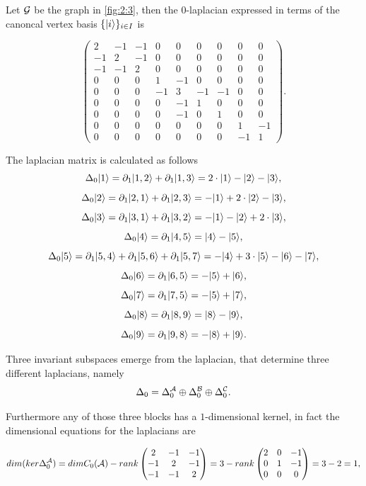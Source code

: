 \documentclass[../2.tex]{subfiles}
\begin{document}
    \begin{exa}
        Let $\mathcal{G}$ be the graph  in \autoref{fig:2:3}, then the $0$-laplacian expressed in terms of the canoncal vertex basis $\{| i \rangle\}_{i \in I}$ is

        \[\begin{pmatrix}
                2 & -1 & -1 & 0 & 0 & 0 & 0 & 0 & 0 \\
                -1 & 2 & -1 & 0 & 0 & 0 & 0 & 0 & 0 \\
                -1 & -1 & 2 & 0 & 0 & 0 & 0 & 0 & 0 \\
                0 & 0 & 0 & 1 & -1 & 0 & 0 & 0 & 0 \\
                0 & 0 & 0 & -1 & 3 & -1 & -1 & 0 & 0 \\
                0 & 0 & 0 & 0 & -1 & 1 & 0 & 0 & 0 \\
                0 & 0 & 0 & 0 & -1 & 0 & 1 & 0 & 0 \\
                0 & 0 & 0 & 0 & 0 & 0 & 0 & 1 & -1 \\
                0 & 0 & 0 & 0 & 0 & 0 & 0 & -1 & 1 
            \end{pmatrix}. \] 

        The laplacian matrix is calculated as follows
        \[ \Delta_0 | 1 \rangle = \partial_1| 1,2 \rangle + \partial_1| 1,3 \rangle = 2\cdot| 1 \rangle-| 2 \rangle-| 3 \rangle,\]
        \[ \Delta_0 | 2 \rangle = \partial_1| 2,1 \rangle + \partial_1| 2,3 \rangle = -| 1 \rangle+2\cdot| 2 \rangle-| 3 \rangle,\]
        \[ \Delta_0 | 3 \rangle = \partial_1| 3,1 \rangle + \partial_1| 3,2 \rangle = -| 1 \rangle-| 2 \rangle+2\cdot| 3 \rangle,\]
        \[ \Delta_0 | 4 \rangle = \partial_1| 4,5 \rangle = | 4 \rangle-| 5 \rangle,\]
        \[ \Delta_0 | 5 \rangle = \partial_1| 5,4 \rangle+\partial_1| 5,6 \rangle+\partial_1| 5,7 \rangle = -| 4 \rangle+3\cdot| 5 \rangle-| 6 \rangle-| 7 \rangle,\]
        \[ \Delta_0 | 6 \rangle = \partial_1| 6,5 \rangle = -| 5 \rangle+| 6 \rangle,\]
        \[ \Delta_0 | 7 \rangle = \partial_1| 7,5 \rangle = -| 5 \rangle+| 7 \rangle,\]
        \[ \Delta_0 | 8 \rangle = \partial_1| 8,9 \rangle = | 8 \rangle-| 9 \rangle,\]
        \[ \Delta_0 | 9 \rangle = \partial_1| 9,8 \rangle = -| 8 \rangle+| 9 \rangle.\] 

        Three invariant subspaces emerge from the laplacian, that determine three different laplacians, namely
        \[ \Delta_0 = \Delta_0^{\mathcal{A}} \oplus \Delta_0^{\mathcal{B}} \oplus \Delta_0^{\mathcal{C}}. \]

        Furthermore any of those three blocks has a $1$-dimensional kernel, in fact the dimensional equations for the laplacians are

        \[dim(ker\Delta_0^{\mathcal{A}}) =dimC_0(\mathcal{A}) - rank
        \begin{pmatrix}
            2 & -1 & -1  \\
            -1 & 2 & -1  \\
            -1 & -1 & 2 
        \end{pmatrix} = 3 - rank
        \begin{pmatrix}
            2 & 0 & -1  \\
            0 & 1 & -1  \\
            0 & 0 & 0 
        \end{pmatrix} = 3 - 2 =  1, \]


\end{exa}
\end{document}
